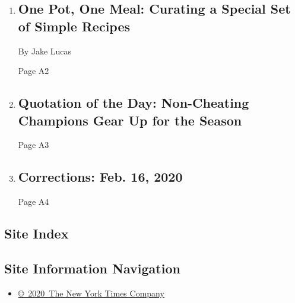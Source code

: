 \begin{enumerate}
\def\labelenumi{\arabic{enumi}.}
\item
  \href{/2020/02/16/reader-center/one-pot-recipes.html}{}

  \hypertarget{one-pot-one-meal-curating-a-special-set-of-simple-recipes}{%
  \subsection{One Pot, One Meal: Curating a Special Set of Simple
  Recipes}\label{one-pot-one-meal-curating-a-special-set-of-simple-recipes}}

  By Jake Lucas

  Page A2
\item
  \href{/2020/02/15/todayspaper/quotation-of-the-day-non-cheating-champions-gear-up-for-the-season.html}{}

  \hypertarget{quotation-of-the-day-non-cheating-champions-gear-up-for-the-season}{%
  \subsection{Quotation of the Day: Non-Cheating Champions Gear Up for
  the
  Season}\label{quotation-of-the-day-non-cheating-champions-gear-up-for-the-season}}

  Page A3
\item
  \href{/2020/02/15/pageoneplus/corrections-feb-16-2020.html}{}

  \hypertarget{corrections-feb-16-2020}{%
  \subsection{Corrections: Feb. 16,
  2020}\label{corrections-feb-16-2020}}

  Page A4
\end{enumerate}

\hypertarget{site-index}{%
\subsection{Site Index}\label{site-index}}

\hypertarget{site-information-navigation}{%
\subsection{Site Information
Navigation}\label{site-information-navigation}}

\begin{itemize}
\tightlist
\item
  \href{https://help.nytimes3xbfgragh.onion/hc/en-us/articles/115014792127-Copyright-notice}{©~2020~The
  New York Times Company}
\end{itemize}

